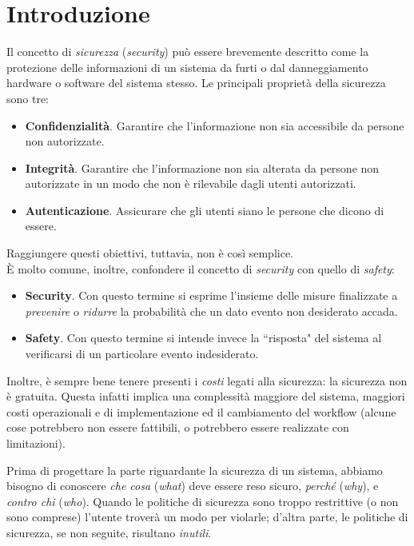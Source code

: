 \chapter{Introduzione}
Il concetto di \textit{sicurezza} (\textit{security}) può essere brevemente descritto come la protezione delle informazioni di un sistema da furti o dal danneggiamento hardware o software del sistema stesso. Le principali proprietà della sicurezza sono tre:
\begin{itemize}
	\item \textbf{Confidenzialità}. Garantire che l'informazione non sia accessibile da persone non autorizzate.
	\item \textbf{Integrità}. Garantire che l'informazione non sia alterata da persone non autorizzate in un modo che non è rilevabile dagli utenti autorizzati.
	\item \textbf{Autenticazione}. Assicurare che gli utenti siano le persone che dicono di essere.
\end{itemize}
Raggiungere questi obiettivi, tuttavia, non è così semplice.\\
È molto comune, inoltre, confondere il concetto di \textit{security} con quello di \textit{safety}:
\begin{itemize}
	\item \textbf{Security}. Con questo termine si esprime l’insieme delle misure finalizzate a \textit{prevenire} o \textit{ridurre} la probabilità che un dato evento non desiderato accada.
	\item \textbf{Safety}. Con questo termine si intende invece la \textquotedblleft risposta" del sistema al verificarsi di un particolare evento indesiderato.
\end{itemize}
Inoltre, è sempre bene tenere presenti i \textit{costi} legati alla sicurezza: la sicurezza non è gratuita. Questa infatti implica una complessità maggiore del sistema, maggiori costi operazionali e di implementazione ed il cambiamento del workflow (alcune cose potrebbero non essere fattibili, o potrebbero essere realizzate con limitazioni).

Prima di progettare la parte riguardante la sicurezza di un sistema, abbiamo bisogno di conoscere \textit{che cosa} (\textit{what}) deve essere reso sicuro, \textit{perché} (\textit{why}), e \textit{contro chi} (\textit{who}). Quando le politiche di sicurezza sono troppo restrittive (o non sono comprese) l'utente troverà un modo per violarle; d'altra parte, le politiche di sicurezza, se non seguite, risultano \textit{inutili}.

